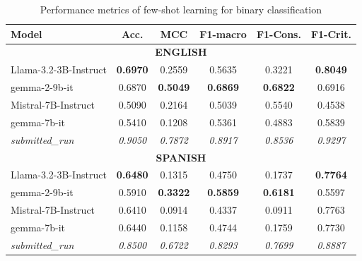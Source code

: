 \documentclass{Configuration_Files/PoliMi3i_thesis}
\begin{document}
\begin{table}[H]
    \centering
    \begin{tabular}{lccccc}
        \hline
        \textbf{Model} & \textbf{Acc.} & \textbf{MCC} & \textbf{F1-macro} & \textbf{F1-Cons.} & \textbf{F1-Crit.}   \\
        \hline
        \multicolumn{6}{c}{\textbf{ENGLISH}} \\
        \hline
        Llama-3.2-3B-Instruct & \textbf{0.6970} & 0.2559 & 0.5635 & 0.3221  & \textbf{0.8049}  \\
        gemma-2-9b-it         & 0.6870 & \textbf{0.5049} & \textbf{0.6869} & \textbf{0.6822} & 0.6916   \\
        Mistral-7B-Instruct   & 0.5090 & 0.2164 & 0.5039 & 0.5540 & 0.4538   \\
        gemma-7b-it           & 0.5410 & 0.1208 & 0.5361 & 0.4883 & 0.5839   \\
        \hline
        \textit{submitted\_run} & \textit{0.9050} & \textit{0.7872} & \textit{0.8917} & \textit{0.8536} & \textit{0.9297}   \\
        \hline
        \hline
        \multicolumn{6}{c}{\textbf{SPANISH}} \\
        \hline
        Llama-3.2-3B-Instruct & \textbf{0.6480} & 0.1315 & 0.4750 & 0.1737  & \textbf{0.7764}  \\
        gemma-2-9b-it         & 0.5910 & \textbf{0.3322} & \textbf{0.5859} & \textbf{0.6181} & 0.5597   \\
        Mistral-7B-Instruct   & 0.6410 & 0.0914 & 0.4337 & 0.0911 & 0.7763   \\
        gemma-7b-it           & 0.6440 & 0.1158 & 0.4744 & 0.1759 & 0.7730   \\
        \hline
        \textit{submitted\_run} & \textit{0.8500} & \textit{0.6722}  & \textit{0.8293} & \textit{0.7699} & \textit{0.8887}   \\
        \hline
    \end{tabular}
    \caption{Performance metrics of few-shot learning for binary classification}
    \label{tab:performance_llms_T1_few_shots_text_gen}
\end{table}
\FloatBarrier
\end{document}
